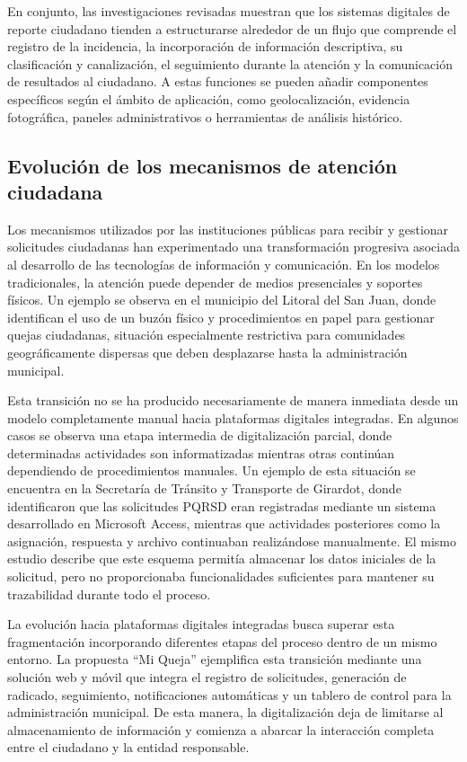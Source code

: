 En conjunto, las investigaciones revisadas muestran que los sistemas digitales de reporte ciudadano tienden a estructurarse alrededor de un flujo que comprende el registro de la incidencia, la incorporación de información descriptiva, su clasificación y canalización, el seguimiento durante la atención y la comunicación de resultados al ciudadano. A estas funciones se pueden añadir componentes específicos según el ámbito de aplicación, como geolocalización, evidencia fotográfica, paneles administrativos o herramientas de análisis histórico.

\subsection{Evolución de los mecanismos de atención ciudadana}

Los mecanismos utilizados por las instituciones públicas para recibir y gestionar solicitudes ciudadanas han experimentado una transformación progresiva asociada al desarrollo de las tecnologías de información y comunicación. En los modelos tradicionales, la atención puede depender de medios presenciales y soportes físicos. Un ejemplo se observa en el municipio del Litoral del San Juan, donde \textcite{murillo2025aplicacion} identifican el uso de un buzón físico y procedimientos en papel para gestionar quejas ciudadanas, situación especialmente restrictiva para comunidades geográficamente dispersas que deben desplazarse hasta la administración municipal.

Esta transición no se ha producido necesariamente de manera inmediata desde un modelo completamente manual hacia plataformas digitales integradas. En algunos casos se observa una etapa intermedia de digitalización parcial, donde determinadas actividades son informatizadas mientras otras continúan dependiendo de procedimientos manuales. Un ejemplo de esta situación se encuentra en la Secretaría de Tránsito y Transporte de Girardot, donde \textcite{moreno2026diseno} identificaron que las solicitudes PQRSD eran registradas mediante un sistema desarrollado en Microsoft Access, mientras que actividades posteriores como la asignación, respuesta y archivo continuaban realizándose manualmente. El mismo estudio describe que este esquema permitía almacenar los datos iniciales de la solicitud, pero no proporcionaba funcionalidades suficientes para mantener su trazabilidad durante todo el proceso.

La evolución hacia plataformas digitales integradas busca superar esta fragmentación incorporando diferentes etapas del proceso dentro de un mismo entorno. La propuesta “Mi Queja” ejemplifica esta transición mediante una solución web y móvil que integra el registro de solicitudes, generación de radicado, seguimiento, notificaciones automáticas y un tablero de control para la administración municipal. \textcite{murillo2025aplicacion} De esta manera, la digitalización deja de limitarse al almacenamiento de información y comienza a abarcar la interacción completa entre el ciudadano y la entidad responsable.

